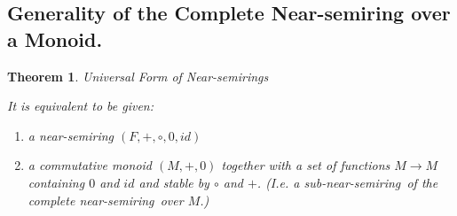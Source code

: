 \documentclass[11pt,a4paper]{article}
\newcommand{\Ns}{near-semiring}
\newcommand{\sns}{sub-near-semiring}
\newtheorem{theorem}{Theorem}
\theoremstyle{definition}
\begin{document}
\subsection{Generality of the Complete Near-semiring over a Monoid.}

\begin{theorem}{Universal Form of Near-semirings}

	It is equivalent to be given:

	\begin{enumerate}

		\item a near-semiring $(F,+,\circ,0,id)$

		\item a commutative monoid $(M,+,0)$ together with a set of functions $M \to M$ containing $0$ and $id$ and stable by $\circ$ and $+$. (I.e. a \sns\ of the complete \Ns\ over $M$.)

	\end{enumerate}

\end{theorem}
\end{document}
